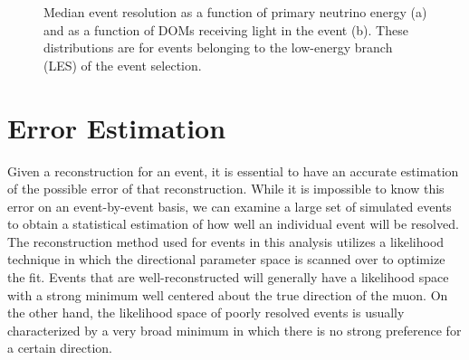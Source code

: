 \documentclass{gatech-thesis}
\begin{document}
\begin{figure}
\centering
{}
\caption{Median event resolution as a function of primary neutrino energy (a) and as a function of DOMs receiving light in the event (b). These distributions are for events belonging to the low-energy branch (LES) of the event selection.}
\label{fig:EventRes}
\end{figure}

\section{Error Estimation}
Given a reconstruction for an event, it is essential to have an accurate estimation of the possible error of that reconstruction. While it is impossible to know this error on an event-by-event basis, we can examine a large set of simulated events to obtain a statistical estimation of how well an individual event will be resolved. The reconstruction method used for events in this analysis utilizes a likelihood technique in which the directional parameter space is scanned over to optimize the fit. Events that are well-reconstructed will generally have a likelihood space with a strong minimum well centered about the true direction of the muon. On the other hand, the likelihood space of poorly resolved events is usually characterized by a very broad minimum in which there is no strong preference for a certain direction.
\end{document}
